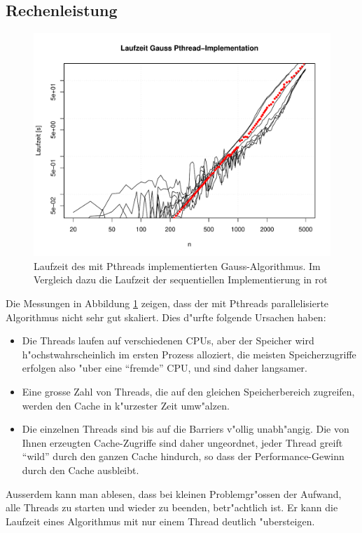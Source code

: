 \subsection{Rechenleistung}
\begin{figure}
\begin{center}
\includegraphics[width=\hsize]{images/gauss-pthread.pdf}
\end{center}
\caption{Laufzeit des mit Pthreads implementierten Gauss-Algorithmus.
Im Vergleich dazu die Laufzeit der sequentiellen Implementierung 
in rot\label{gauss-pthread}}
\end{figure}
Die Messungen in Abbildung \ref{gauss-pthread} zeigen, dass der mit
Pthreads parallelisierte Algorithmus nicht sehr gut skaliert. Dies
d"urfte folgende Ursachen haben:
\begin{itemize}
\item
Die Threads laufen auf verschiedenen CPUs, aber der Speicher wird
h"ochstwahrscheinlich im ersten Prozess alloziert, die meisten
Speicherzugriffe erfolgen also "uber eine ``fremde'' CPU, und sind
daher langsamer.
\item
Eine grosse Zahl von Threads, die auf den gleichen Speicherbereich
zugreifen, werden den Cache in k"urzester Zeit umw"alzen.
\item
Die einzelnen Threads sind bis auf die Barriers v"ollig unabh"angig.
Die von Ihnen erzeugten Cache-Zugriffe sind daher ungeordnet, jeder
Thread greift ``wild'' durch den ganzen Cache hindurch, so dass
der Performance-Gewinn durch den Cache ausbleibt.
\end{itemize}
Ausserdem kann man ablesen, dass bei kleinen Problemgr"ossen der
Aufwand,
alle Threads zu starten und wieder zu beenden, betr"achtlich ist.
Er kann die Laufzeit eines Algorithmus mit nur
einem Thread deutlich "ubersteigen.

